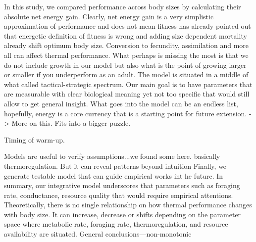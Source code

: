 In  this study, we compared performance across body sizes by calculating their absolute net energy gain.
Clearly, net energy gain is a very simplistic approximation of performance and does not mean fitness
\citet{Kozlowski1996} has already pointed out that energetic definition of fitness is wrong and adding size dependent mortality already shift optimum body size.
Conversion to fecundity, assimilation and more all can affect thermal performance.
What perhaps is missing the most is that we do not include growth in our model but also what is the point of growing larger or smaller if you underperform as an adult. 
The model is situated in a middle of what \citet{Holling1966} called tactical-strategic spectrum.
Our main goal is to have parameters that are measurable with clear biological meaning yet not too specific that would still allow to get general insight. 
What goes into the model can be an endless list, hopefully, energy is a core currency that is a starting point for future extension. -> More on this. Fits into a bigger puzzle.

Timing of warm-up.

Models are useful to verify assumptions...we found some here. basically thermoregulation.
But it can reveal patterns beyond intuition
Finally, we generate testable model that can guide empirical works int he future.
In summary, our integrative model underscores that parameters such as foraging rate, conductance, resource quality that would require empirical attentions.
Theoretically, there is no single relationship on how thermal performance changes with body size.
It can increase, decrease or shifts depending on the parameter space where metabolic rate, foraging rate, thermoregulation, and resource availability are situated.
General conclusions---non-monotonic


